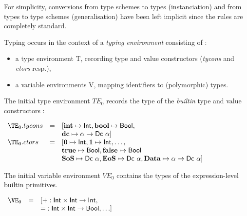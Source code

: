 \medskip
For simplicity, conversions from type schemes to types (instanciation)
and from types to type schemes (generalisation) have been left implicit since the rules are
completely standard.

\medskip
Typing occurs in the context of a \emph{typing environment} consisting of :
\begin{itemize}
\item a type environment T, recording type and value constructors (\emph{tycons} and \emph{ctors}
  resp.),
\item a variable environments V, mapping identifiers to (polymorphic) types.
\end{itemize}

\medskip
The initial type environment $TE_0$ records the type of the \emph{builtin} type and value
constructors :

$\begin{array}{lcl}
\TE_0.tycons & = & [ \sy{int}\mapsto \sem{Int}, \sy{bool}\mapsto \sem{Bool}, \\
             &   &   \sy{dc}\mapsto \alpha \rightarrow \sem{Dc}~\alpha ] \\
\TE_0.ctors & = & [ \sy{0} \mapsto \sem{Int}, \sy{1} \mapsto \sem{Int}, \ldots, \\
            &   & \sy{true} \mapsto \sem{Bool}, \sy{false} \mapsto \sem{Bool} \\
            &   & \sy{SoS} \mapsto \sem{Dc}~\alpha, \sy{EoS} \mapsto \sem{Dc}~\alpha, \sy{Data} \mapsto \alpha \rightarrow \sem{Dc}~\alpha ] \\
\end{array}$


The initial variable environment $VE_0$ contains the types of the expression-level builtin
primitives.

$\begin{array}{lcl}
\VE_0 & = & [ \sy{+} : \sem{Int} \times \sem{Int} \rightarrow \sem{Int}, \\
      &   &   \sy{=} : \sem{Int} \times \sem{Int} \rightarrow \sem{Bool}, \ldots ] \\
\end{array}$

